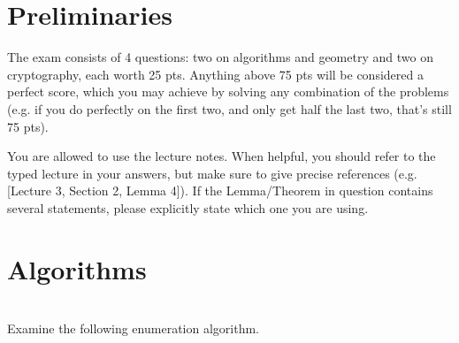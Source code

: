 

 

\exam

\section{Preliminaries}

The exam consists of 4 questions: two on algorithms and geometry and two on cryptography, each worth 25 pts. Anything above 75 pts will be considered a perfect score, which you may achieve by solving any combination of the problems (e.g. if you do perfectly on the first two, and only get half the last two, that's still 75 pts).

You are allowed to use the lecture notes. When helpful, you should refer to the typed lecture in your answers, but make sure to give precise references (e.g. [Lecture 3, Section 2, Lemma 4]). If the Lemma/Theorem in question contains several statements, please explicitly state which one you are using.

\section{Algorithms}

\begin{exercise}~\hspace{1em}\\
Examine the following enumeration algorithm.
\end{exercise}



